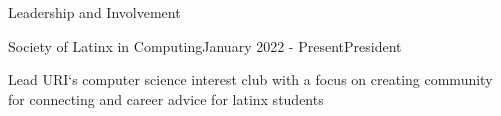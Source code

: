 \documentclass[
	11pt, %
]{resume} %
\begin{document}
\begin{rSection}{Leadership and Involvement}

	\begin{rSubsection}{Society of Latinx in Computing}{January 2022 - Present}{President}{}
		\item Lead URI`s computer science interest club with a focus on creating community for connecting and career advice for latinx students
	\end{rSubsection}

\end{rSection}





\end{document}
